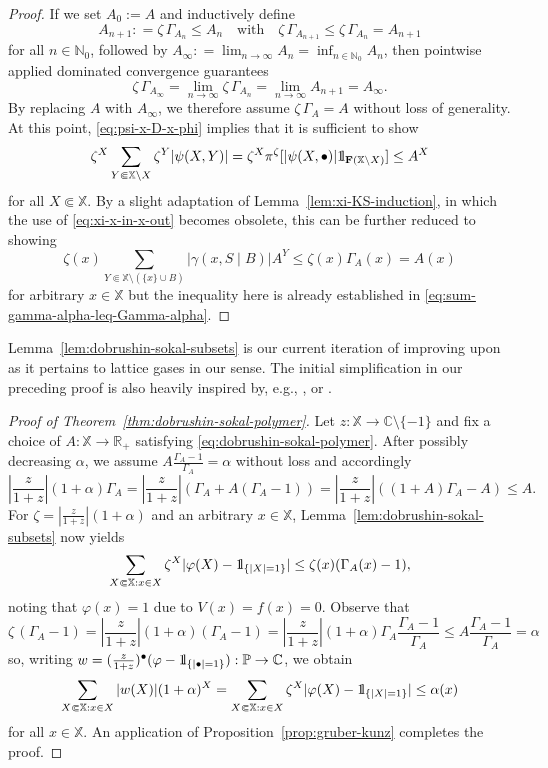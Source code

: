 \documentclass[10pt,a4paper]{amsart}
\newcommand{\N}{\mathbb{N}}
\newcommand{\R}{\mathbb{R}}
\newcommand{\C}{\mathbb{C}}
\renewcommand{\P}{\mathbb{P}}
\newcommand{\X}{\mathbb X}
\def\1{{\mathchoice {1\mskip-4mu\mathrm l}      
{1\mskip-4mu\mathrm l}
{1\mskip-4.5mu\mathrm l} {1\mskip-5mu\mathrm l}}}
\begin{document}
\begin{proof}
	If we set $A_0 := A$ and inductively define
	\[
		A_{n+1} : = \zeta \, \Gamma_{A_n} \leq A_n \quad \text{with} \quad \zeta \, \Gamma_{A_{n+1}} \leq \zeta \, \Gamma_{A_n} = A_{n+1}
	\]
	for all $n \in \N_0$, followed by $A_\infty : = \lim_{n\to\infty} A_n = \inf_{n \in \N_0} A_n$, then pointwise applied dominated convergence guarantees
	\[
		\zeta \, \Gamma_{A_\infty} = \lim_{n \to \infty} \zeta \, \Gamma_{A_n} = \lim_{n \to \infty} A_{n+1} = A_\infty.
	\]
	By replacing $A$ with $A_\infty$, we therefore assume $\zeta \, \Gamma_A = A$ without loss of generality. 
	At this point, \eqref{eq:psi-x-D-x-phi} implies that it is sufficient to show
	\[
		\zeta^X \sum_{Y \Subset \X \setminus X} \zeta^Y |\psi(X, Y)| = \zeta^X \pi^\zeta[|\psi(X, \bullet)| \1_{\mathbf F(\X \setminus X)}] \leq A^X
	\]
	for all $X \Subset \X$. 
	By a slight adaptation of Lemma~\ref{lem:xi-KS-induction}, in which the use of \eqref{eq:xi-x-in-x-out} becomes obsolete, this can be further reduced to showing
	\[
		\zeta(x) \sum_{Y \Subset \X \setminus (\{x\} \cup B)} |\gamma(x, S \mid B)| A^Y \leq \zeta(x) \Gamma_A(x) = A(x)
	\]
	for arbitrary $x \in \X$ but the inequality here is already established in \eqref{eq:sum-gamma-alpha-leq-Gamma-alpha}.
\end{proof}

Lemma~\ref{lem:dobrushin-sokal-subsets} is our current iteration of improving upon \cite[Theorem~2]{ref:procacci-scoppola} as it pertains to lattice gases in our sense. 
The initial simplification in our preceding proof is also heavily inspired by, e.g., \cite{ref:fernandez-procacci, ref:bissacot-fernandez-procacci}, \cite{ref:faris} or \cite{ref:jansen-hierarchical}.


\begin{proof}[Proof of Theorem~\ref{thm:dobrushin-sokal-polymer}]
	Let $z : \X \to \C \setminus \{-1\}$ and fix a choice of $A : \X \to \R_+$ satisfying \eqref{eq:dobrushin-sokal-polymer}. 
	After possibly decreasing $\alpha$, we assume $A\frac{\Gamma_A-1}{\Gamma_A} = \alpha$  without loss and accordingly
	\[
		|{\textstyle \frac{z}{1+z}}| (1+\alpha) \Gamma_A = |{\textstyle \frac{z}{1+z}}| (\Gamma_A + A (\Gamma_A-1)) = |{\textstyle \frac{z}{1+z}}| ((1+A) \Gamma_A - A) \leq A.
	\]
	For $\zeta = |\frac{z}{1+z}| (1 + \alpha)$ and an arbitrary $x \in \X$, Lemma~\ref{lem:dobrushin-sokal-subsets} now yields
	\[
		\sum_{X \Subset \X : x \in X} \zeta^X |\varphi(X) - \1_{\{|X|=1\}}| \leq \zeta(x) (\Gamma_A(x) - 1),
	\]
	noting that $\varphi(x) = 1$ due to $V(x) = f(x) = 0$. 
	Observe that
	\[
		\zeta \, (\Gamma_A - 1) = |{\textstyle \frac{z}{1+z}}| (1 + \alpha) (\Gamma_A - 1) = |{\textstyle \frac{z}{1+z}}| (1 + \alpha) \Gamma_A {\textstyle \frac{\Gamma_A - 1}{\Gamma_A}} \leq A {\textstyle \frac{\Gamma_A - 1}{\Gamma_A}} = \alpha
	\]
	so, writing $w = (\frac{z}{1+z})^\bullet (\varphi - \1_{\{|\bullet| = 1\}}) : \P \to \C$, we obtain
	\[
		\sum_{X \Subset \X : x \in X} |w(X)|(1+\alpha)^X = \sum_{X \Subset \X : x \in X} \zeta^X |\varphi(X) - \1_{\{|X|=1\}}| \leq \alpha(x)
	\]
	for all $x \in \X$. 
	An application of Proposition~\ref{prop:gruber-kunz} completes the proof.
\end{proof}
\end{document}
